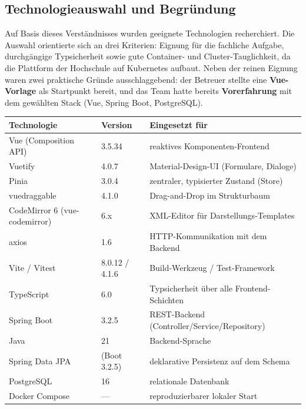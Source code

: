 \documentclass[11pt,a4paper]{article}
\begin{document}
\subsection{Technologieauswahl und Begründung}\label{sec:tech}
Auf Basis dieses Verständnisses wurden geeignete Technologien recherchiert. Die
Auswahl orientierte sich an drei Kriterien: Eignung für die fachliche Aufgabe,
durchgängige Typsicherheit sowie gute Container- und Cluster-Tauglichkeit, da die
Plattform der Hochschule auf Kubernetes aufbaut. Neben der reinen Eignung waren
zwei praktische Gründe ausschlaggebend: der Betreuer stellte eine
\textbf{Vue-Vorlage} als Startpunkt bereit, und das Team hatte bereits
\textbf{Vorerfahrung} mit dem gewählten Stack (Vue, Spring Boot, PostgreSQL).

\begin{center}
\begin{tabularx}{\linewidth}{@{}l l Y@{}}
\toprule
\textbf{Technologie} & \textbf{Version} & \textbf{Eingesetzt für} \\
\midrule
Vue (Composition API) & 3.5.34 & reaktives Komponenten-Frontend \\
Vuetify & 4.0.7 & Material-Design-UI (Formulare, Dialoge) \\
Pinia & 3.0.4 & zentraler, typisierter Zustand (Store) \\
vuedraggable & 4.1.0 & Drag-and-Drop im Strukturbaum \\
CodeMirror 6 (vue-codemirror) & 6.x & XML-Editor für Darstellungs-Templates \\
axios & 1.6 & HTTP-Kommunikation mit dem Backend \\
Vite / Vitest & 8.0.12 / 4.1.6 & Build-Werkzeug / Test-Framework \\
TypeScript & 6.0 & Typsicherheit über alle Frontend-Schichten \\
Spring Boot & 3.2.5 & REST-Backend (Controller/Service/Repository) \\
Java & 21 & Backend-Sprache \\
Spring Data JPA & (Boot 3.2.5) & deklarative Persistenz auf dem Schema \\
PostgreSQL & 16 & relationale Datenbank \\
Docker Compose & --- & reproduzierbarer lokaler Start \\
\bottomrule
\end{tabularx}
\end{center}
\end{document}
